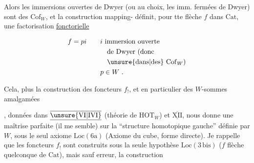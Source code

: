 Alors les immersions ouvertes de Dwyer (ou au choix, les imm. fermées de Dwyer) sont des $\mathrm{Cof}_W$, et la construction   mapping-\unsure{,} définit, pour tte flèche $f$ dans $\mathrm{Cat}$, une factorisation \uline{fonctorielle}

\[
\begin{aligned}
f=pi \qquad &i\ \text{immersion ouverte}\\
&\quad\text{de Dwyer (donc}\\
&\quad\text{\unsure{dans|des} }\mathrm{Cof}_W\text{)}\\
&p\in W\ .
\end{aligned}
\]

Cela, plus la construction des foncteurs $f_!$, et en particulier des $W$-sommes amalgamées


, données dans $\underline{\overline{\unsure{\mathrm{VI}|\mathrm{IVI}}}}$ (théorie de $\mathrm{HOT}_W$) et $\underline{\overline{\mathrm{XII}}}$, nous donne une maîtrise parfaite (il me semble) sur la ``structure homotopique gauche'' définie par $W$, sous le seul axiome $\mathrm{Loc}(6\mathrm{a})$ (Axiome du cube, forme directe). Je rappelle que les foncteurs $f_!$ sont construits  sous la seule hypothèse \uline{$\mathrm{Loc}(3\,\mathrm{bis})$} ($f$ flèche quelconque de $\mathrm{Cat}$), mais sauf erreur,  la construction

